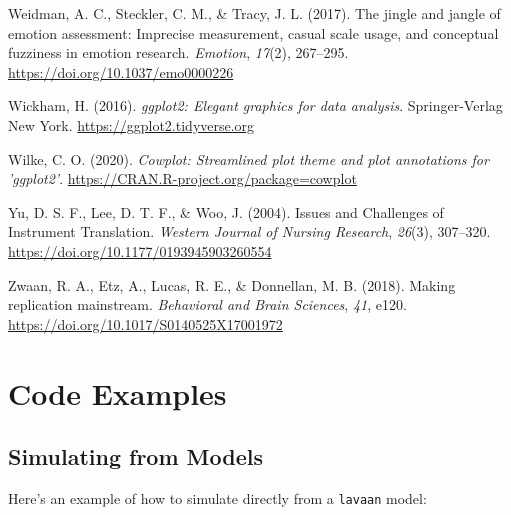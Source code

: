 \documentclass[
  man]{apa7}
\newlength{\cslhangindent}
\newenvironment{CSLReferences}[2] %
 {\begin{list}{}{%
  \setlength{\itemindent}{0pt}
  \setlength{\leftmargin}{0pt}
  \setlength{\parsep}{0pt}
  \ifodd #1
   \setlength{\leftmargin}{\cslhangindent}
   \setlength{\itemindent}{-1\cslhangindent}
  \fi
  \setlength{\itemsep}{#2\baselineskip}}}
 {\end{list}}
\begin{document}
\begin{CSLReferences}{1}{0}
Weidman, A. C., Steckler, C. M., \& Tracy, J. L. (2017). The jingle and jangle of emotion assessment: Imprecise measurement, casual scale usage, and conceptual fuzziness in emotion research. \emph{Emotion}, \emph{17}(2), 267--295. \url{https://doi.org/10.1037/emo0000226}

Wickham, H. (2016). \emph{ggplot2: Elegant graphics for data analysis}. Springer-Verlag New York. \url{https://ggplot2.tidyverse.org}

Wilke, C. O. (2020). \emph{Cowplot: Streamlined plot theme and plot annotations for 'ggplot2'}. \url{https://CRAN.R-project.org/package=cowplot}

Yu, D. S. F., Lee, D. T. F., \& Woo, J. (2004). Issues and Challenges of Instrument Translation. \emph{Western Journal of Nursing Research}, \emph{26}(3), 307--320. \url{https://doi.org/10.1177/0193945903260554}

Zwaan, R. A., Etz, A., Lucas, R. E., \& Donnellan, M. B. (2018). Making replication mainstream. \emph{Behavioral and Brain Sciences}, \emph{41}, e120. \url{https://doi.org/10.1017/S0140525X17001972}

\end{CSLReferences}

\newpage

\appendix


\section{Code Examples}\label{code-examples}

\subsection{Simulating from Models}\label{simulating-from-models}

Here's an example of how to simulate directly from a \texttt{lavaan} model:

\small
\end{document}
